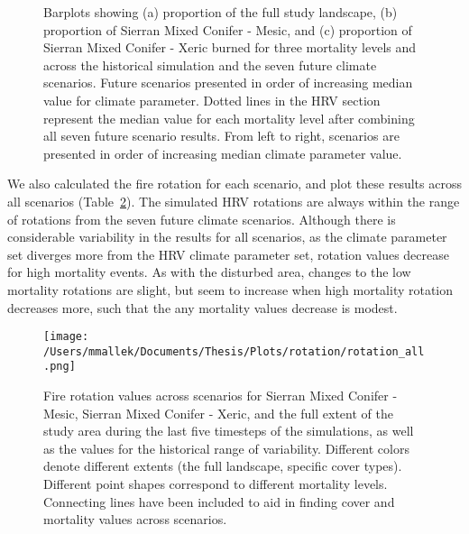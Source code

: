 \documentclass[12pt]{article}
\begin{document}
\begin{spacing}{1}
\begin{figure}[!htbp]
  \centering


    \caption{Barplots showing (a) proportion of the full study landscape, (b) proportion of Sierran Mixed Conifer - Mesic, and (c) proportion of Sierran Mixed Conifer - Xeric burned for three mortality levels and across the historical simulation and the seven future climate scenarios. Future scenarios presented in order of increasing median value for climate parameter. Dotted lines in the HRV section represent the median value for each mortality level after combining all seven future scenario results. From left to right, scenarios are presented in order of increasing median climate parameter value.}
  \label{fig:dareacomp}
\end{figure}

We also calculated the fire rotation for each scenario, and plot these results across all scenarios (Table~\ref{fig:frotation}). The simulated HRV rotations are always within the range of rotations from the seven future climate scenarios. Although there is considerable variability in the results for all scenarios, as the climate parameter set diverges more from the HRV climate parameter set, rotation values decrease for high mortality events. As with the disturbed area, changes to the low mortality rotations are slight, but seem to increase when high mortality rotation decreases more, such that the any mortality values decrease is modest. 



\begin{figure}
\centering
\texttt{[image: /Users/mmallek/Documents/Thesis/Plots/rotation/rotation\_all.png]}
\caption{Fire rotation values across scenarios for Sierran Mixed Conifer - Mesic, Sierran Mixed Conifer - Xeric, and the full extent of the study area during the last five timesteps of the simulations, as well as the values for the historical range of variability. Different colors denote different extents (the full landscape, specific cover types). Different point shapes correspond to different mortality levels. Connecting lines have been included to aid in finding cover and mortality values across scenarios.}
\label{fig:frotation}
\end{figure}



\end{spacing}
\end{document}
